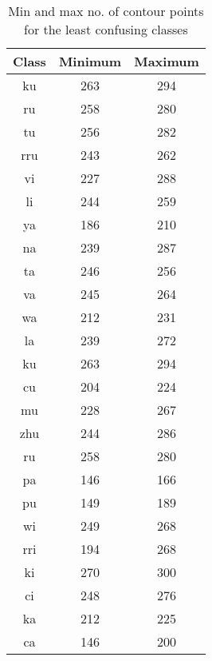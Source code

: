   
\begin{table}[!t]\center
  \begin{tabular}{ccc}
\toprule
\textbf{Class}  & \textbf{Minimum} & \textbf{Maximum} \\
\midrule
ku & 263 & 294 \\  
ru & 258 & 280 \\  
tu & 256 & 282 \\  
rru & 243 & 262 \\  
vi & 227 & 288 \\  
li & 244 & 259 \\  
ya & 186 & 210 \\  
na & 239 & 287 \\  
ta & 246 & 256 \\  
va & 245 & 264 \\  
wa & 212 & 231 \\  
la & 239 & 272 \\  
ku & 263 & 294 \\  
cu & 204 & 224 \\  
mu & 228 & 267 \\  
zhu & 244 & 286 \\  
ru & 258 & 280 \\  
pa & 146 & 166 \\  
pu & 149 & 189 \\  
wi & 249 & 268 \\  
rri & 194 & 268 \\  
ki & 270 & 300 \\  
ci & 248 & 276 \\  
ka & 212 & 225 \\  
ca & 146 & 200 \\  

\bottomrule
\end{tabular}
  \caption{Min and max no. of contour points for the least confusing classes}\label{MMAX}
\end{table}